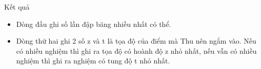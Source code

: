 Kết quả
\begin{itemize}
	\item     Dòng đầu ghi số lần đập băng nhiều nhất có thể.   
	\item     Dòng thứ hai ghi 2 số z và t là tọa độ của điểm mà Thu nên ngắm vào. Nếu có nhiều nghiệm thì ghi ra tọa độ có hoành độ z nhỏ nhất, nếu vẫn có nhiều nghiệm thì ghi ra nghiệm có tung độ t nhỏ nhất.   
\end{itemize}